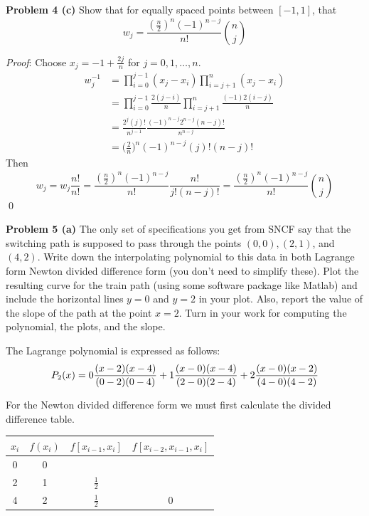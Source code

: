 \documentclass[12pt]{article}
\newcommand{\problem}[1]{\hspace{-4 ex} \large \textbf{Problem #1} }
\renewenvironment{proof}{\hspace{-4 ex} \emph{Proof}:}{\qed}
\begin{document}
\problem{4 (c)} Show that for equally spaced points between $[-1,1]$, that 
$$
w_j = \frac{ (\tfrac{n}{2})^n (-1)^{n-j} }{ n! }  {{n}\choose{j}}
$$

	\begin{proof}
		Choose $x_j = -1 + \tfrac{2j}{n}$ for $j = 0, 1, \dots, n$.
		\begin{align*}
			w_j^{-1} & = \prod_{i=0}^{j-1}(x_j - x_i) \prod_{i=j+1}^{n}(x_j - x_i) \\
			& = \prod_{i=0}^{j-1} \frac{2(j-i)}{n} \prod_{i=j+1}^{n} \frac{(-1)2(i-j)}{n} \\
			& = \frac{ 2^{j} (j)!}{ n^{j-1}} \frac{(-1)^{n-j} 2^{n-j} (n-j)!}{ n^{n-j}} \\
			& = \big( \tfrac{2}{n} \big)^{n} (-1)^{n-j} (j)! (n-j)!
		\end{align*}
		Then
		$$
		w_j = w_j \frac{n!}{n!} = \frac{ (\tfrac{n}{2})^n (-1)^{n-j} }{ n! } \frac{n!}{j!(n-j)!} = \frac{ (\tfrac{n}{2})^n (-1)^{n-j} }{ n! }  {{n}\choose{j}}
		$$
	\end{proof}

\problem{5 (a)} The only set of specifications you get from SNCF say that the switching path is supposed
to pass through the points $(0, 0), (2, 1)$, and $(4, 2)$. Write down the interpolating polynomial
to this data in both Lagrange form Newton divided difference form (you don’t
need to simplify these). Plot the resulting curve for the train path (using some software
package like Matlab) and include the horizontal lines $y = 0$ and $y = 2$ in your plot.
Also, report the value of the slope of the path at the point $x = 2$. Turn in your work for
computing the polynomial, the plots, and the slope.

	The Lagrange polynomial is expressed as follows:
	$$
	P_2(x) = 0 \frac{ (x-2)(x-4) }{(0-2)(0-4) } + 1 \frac{ (x-0)(x-4) }{(2-0)(2-4) } + 2 \frac{ (x-0)(x-2) }{(4-0)(4-2) } \\
	$$

	For the Newton divided difference form we must first calculate the divided difference table.
	\begin{center}
		\begin{tabular}{|c|c|c|c|}\hline
			$x_i$ & $f(x_i)$ & $f[x_{i-1},x_i]$ & $f[x_{i-2}, x_{i-1}, x_i]$ \\ \hline
			0 &0 & & \\ \hline
			2 &1 & $\tfrac{1}{2}$ & \\ \hline
			4 &2 & $\tfrac{1}{2}$ & 0 \\ \hline
		\end{tabular}
	\end{center}
	
\end{document}
